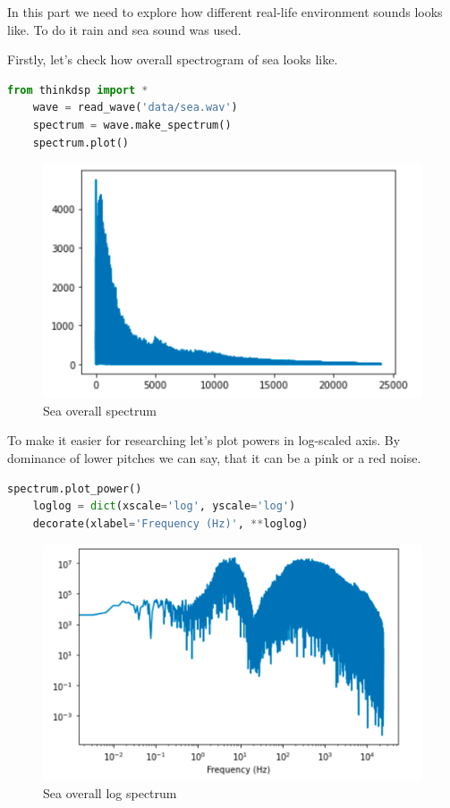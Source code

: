 \documentclass[a4paper]{article}
\begin{document}
        In this part we need to explore how different real-life environment sounds looks like. To do it rain and sea sound was used.
        
        Firstly, let's check how overall spectrogram of sea looks like.
        \begin{lstlisting}[language=Python,caption=File load and spectrum plotting,label={lst:part1_1}]
    from thinkdsp import *
    wave = read_wave('data/sea.wav')
    spectrum = wave.make_spectrum()
    spectrum.plot()
        \end{lstlisting}
        \begin{figure}[H]
            \centering
            \includegraphics[width=\textwidth]{img/sea_overall.png}
            \caption{Sea overall spectrum}
            \label{fig:part1_1_1}
        \end{figure}
        
        To make it easier for researching let's plot powers in log-scaled axis. By dominance of lower pitches we can say, that it can be a pink or a red noise.
        \begin{lstlisting}[language=Python,caption=Log spectrum,label={lst:part1_2}]
    spectrum.plot_power()
    loglog = dict(xscale='log', yscale='log')
    decorate(xlabel='Frequency (Hz)', **loglog)
        \end{lstlisting}
        \begin{figure}[H]
            \centering
            \includegraphics[width=\textwidth]{img/sea_overall_log.png}
            \caption{Sea overall log spectrum}
            \label{fig:part1_1_2}
        \end{figure}
        
\end{document}
